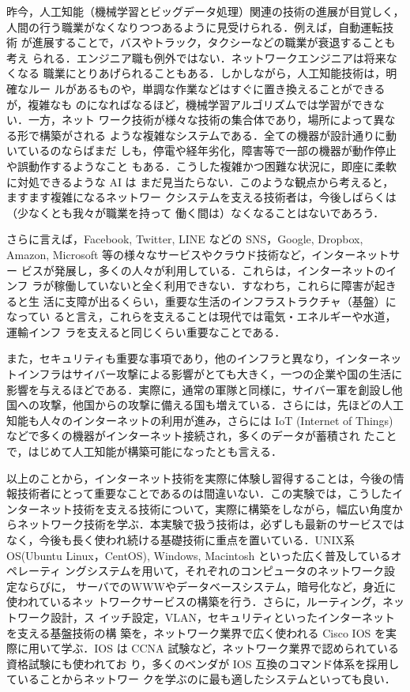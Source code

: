 %

昨今，人工知能（機械学習とビッグデータ処理）関連の技術の進展が目覚しく，
人間の行う職業がなくなりつつあるように見受けられる．例えば，自動運転技術
が進展することで，バスやトラック，タクシーなどの職業が衰退することも考え
られる．エンジニア職も例外ではない．ネットワークエンジニアは将来なくなる
職業にとりあげられることもある．しかしながら，人工知能技術は，明確なルー
ルがあるものや，単調な作業などはすぐに置き換えることができるが，複雑なも
のになればなるほど，機械学習アルゴリズムでは学習ができない．一方，ネット
ワーク技術が様々な技術の集合体であり，場所によって異なる形で構築がされる
ような複雑なシステムである．全ての機器が設計通りに動いているのならばまだ
しも，停電や経年劣化，障害等で一部の機器が動作停止や誤動作するようなこと
もある．こうした複雑かつ困難な状況に，即座に柔軟に対処できるような AI は
まだ見当たらない．このような観点から考えると，ますます複雑になるネットワー
クシステムを支える技術者は，今後しばらくは（少なくとも我々が職業を持って
働く間は）なくなることはないであろう．

さらに言えば，Facebook, Twitter, LINE などの SNS，Google, Dropbox,
Amazon, Microsoft 等の様々なサービスやクラウド技術など，インターネットサー
ビスが発展し，多くの人々が利用している．これらは，インターネットのインフ
ラが稼働していないと全く利用できない．すなわち，これらに障害が起きると生
活に支障が出るくらい，重要な生活のインフラストラクチャ（基盤）になってい
ると言え，これらを支えることは現代では電気・エネルギーや水道，運輸インフ
ラを支えると同じくらい重要なことである．

また，セキュリティも重要な事項であり，他のインフラと異なり，インターネッ
トインフラはサイバー攻撃による影響がとても大きく，一つの企業や国の生活に
影響を与えるほどである．実際に，通常の軍隊と同様に，サイバー軍を創設し他
国への攻撃，他国からの攻撃に備える国も増えている．さらには，先ほどの人工
知能も人々のインターネットの利用が進み，さらには IoT (Internet of
Things) などで多くの機器がインターネット接続され，多くのデータが蓄積され
たことで，はじめて人工知能が構築可能になったとも言える．

以上のことから，インターネット技術を実際に体験し習得することは，今後の情
報技術者にとって重要なことであるのは間違いない．この実験では，こうしたイ
ンターネット技術を支える技術について，実際に構築をしながら，幅広い角度か
らネットワーク技術を学ぶ．本実験で扱う技術は，必ずしも最新のサービスでは
なく，今後も長く使われ続ける基礎技術に重点を置いている．UNIX系OS(Ubuntu
Linux，CentOS), Windows, Macintosh といった広く普及しているオペレーティ
ングシステムを用いて，それぞれのコンピュータのネットワーク設定ならびに，
サーバでのWWWやデータベースシステム，暗号化など，身近に使われているネッ
トワークサービスの構築を行う．さらに，ルーティング，ネットワーク設計，ス
イッチ設定，VLAN，セキュリティといったインターネットを支える基盤技術の構
築を，ネットワーク業界で広く使われる Cisco IOS を実際に用いて学ぶ．IOS 
は CCNA 試験など，ネットワーク業界で認められている資格試験にも使われてお
り，多くのベンダが IOS 互換のコマンド体系を採用していることからネットワー
クを学ぶのに最も適したシステムといっても良い．


